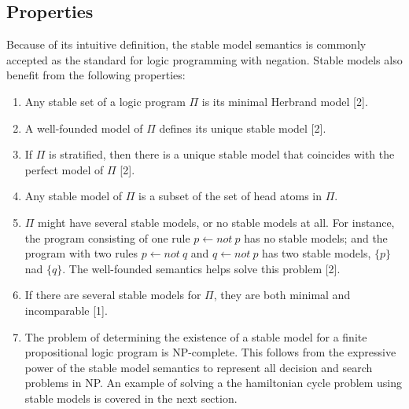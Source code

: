\subsection{Properties}
Because of its intuitive definition, the stable model semantics is commonly 
accepted as the standard for logic programming with negation. Stable models 
also benefit from the following properties:
\begin{enumerate}[label=(\roman*)]
    \item Any stable set of a logic program $\Pi$ is its minimal Herbrand model [2]. 
    \item A well-founded model of $\Pi$ defines its unique stable model [2]. 
    \item If $\Pi$ is stratified, then there is a unique stable model that coincides 
    with the perfect model of $\Pi$ [2].
    \item Any stable model of $\Pi$ is a subset of the set of head atoms in $\Pi$.
    \item $\Pi$ might have several stable models, or no stable models at all. For 
    instance, the program consisting of one rule $p \leftarrow not \: p$ has no 
    stable models; and the program with two rules $p \leftarrow not \: q$ 
    and $q \leftarrow not \: p$ has two stable models, $\{p\}$ nad $\{q\}$. The 
    well-founded semantics helps solve this problem [2].
    \item If there are several stable models for $\Pi$, they are both minimal 
    and incomparable [1]. 
    \item The problem of determining the existence of a stable model for a finite 
    propositional logic program is NP-complete. This follows from the expressive 
    power of the stable model semantics to represent all decision and search 
    problems in NP. An example of solving a the hamiltonian cycle problem 
    using stable models is covered in the next section. 
\end{enumerate}


